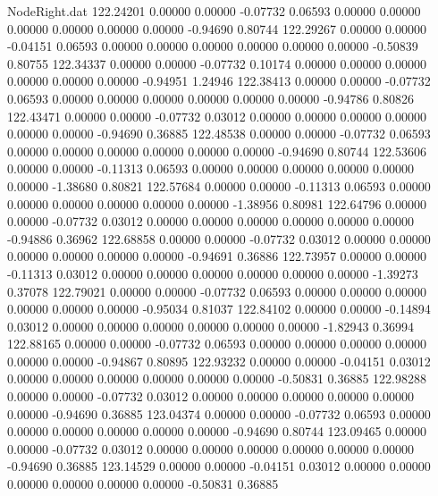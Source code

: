 \begin{filecontents}{NodeRight.dat}
 122.24201    0.00000    0.00000    -0.07732    0.06593    0.00000    0.00000    0.00000    0.00000    0.00000    0.00000   -0.94690    0.80744
 122.29267    0.00000    0.00000    -0.04151    0.06593    0.00000    0.00000    0.00000    0.00000    0.00000    0.00000   -0.50839    0.80755
 122.34337    0.00000    0.00000    -0.07732    0.10174    0.00000    0.00000    0.00000    0.00000    0.00000    0.00000   -0.94951    1.24946
 122.38413    0.00000    0.00000    -0.07732    0.06593    0.00000    0.00000    0.00000    0.00000    0.00000    0.00000   -0.94786    0.80826
 122.43471    0.00000    0.00000    -0.07732    0.03012    0.00000    0.00000    0.00000    0.00000    0.00000    0.00000   -0.94690    0.36885
 122.48538    0.00000    0.00000    -0.07732    0.06593    0.00000    0.00000    0.00000    0.00000    0.00000    0.00000   -0.94690    0.80744
 122.53606    0.00000    0.00000    -0.11313    0.06593    0.00000    0.00000    0.00000    0.00000    0.00000    0.00000   -1.38680    0.80821
 122.57684    0.00000    0.00000    -0.11313    0.06593    0.00000    0.00000    0.00000    0.00000    0.00000    0.00000   -1.38956    0.80981
 122.64796    0.00000    0.00000    -0.07732    0.03012    0.00000    0.00000    0.00000    0.00000    0.00000    0.00000   -0.94886    0.36962
 122.68858    0.00000    0.00000    -0.07732    0.03012    0.00000    0.00000    0.00000    0.00000    0.00000    0.00000   -0.94691    0.36886
 122.73957    0.00000    0.00000    -0.11313    0.03012    0.00000    0.00000    0.00000    0.00000    0.00000    0.00000   -1.39273    0.37078
 122.79021    0.00000    0.00000    -0.07732    0.06593    0.00000    0.00000    0.00000    0.00000    0.00000    0.00000   -0.95034    0.81037
 122.84102    0.00000    0.00000    -0.14894    0.03012    0.00000    0.00000    0.00000    0.00000    0.00000    0.00000   -1.82943    0.36994
 122.88165    0.00000    0.00000    -0.07732    0.06593    0.00000    0.00000    0.00000    0.00000    0.00000    0.00000   -0.94867    0.80895
 122.93232    0.00000    0.00000    -0.04151    0.03012    0.00000    0.00000    0.00000    0.00000    0.00000    0.00000   -0.50831    0.36885
 122.98288    0.00000    0.00000    -0.07732    0.03012    0.00000    0.00000    0.00000    0.00000    0.00000    0.00000   -0.94690    0.36885
 123.04374    0.00000    0.00000    -0.07732    0.06593    0.00000    0.00000    0.00000    0.00000    0.00000    0.00000   -0.94690    0.80744
 123.09465    0.00000    0.00000    -0.07732    0.03012    0.00000    0.00000    0.00000    0.00000    0.00000    0.00000   -0.94690    0.36885
 123.14529    0.00000    0.00000    -0.04151    0.03012    0.00000    0.00000    0.00000    0.00000    0.00000    0.00000   -0.50831    0.36885

\end{filecontents}
